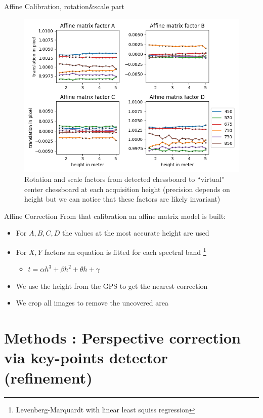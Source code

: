 \documentclass{beamer}
\begin{document}
		\begin{frame}{Affine Calibration, rotation\&scale part}
			\begin{figure}
				\includegraphics[width=0.7\linewidth]{../figures/affine-rotation-height.png}
				\caption{Rotation and scale factors from detected chessboard to ``virtual'' center chessboard at each acquisition height (precision depends on height but we can notice that these factors are likely invariant)}
			\end{figure}
		\end{frame}
	
		\begin{frame}{Affine Correction}
			From that calibration an affine matrix model is built:
			
			\begin{itemize}
				\item For $A,B,C,D$ the values at the most accurate height are used
				\item For $X,Y$ factors an equation is fitted for each spectral band \footnote{Levenberg-Marquardt with linear least squiss regression}
				\begin{itemize}
					\item $t = \alpha h^3 + \beta h^2 + \theta h + \gamma$
				\end{itemize}
				\item We use the height from the GPS to get the nearest correction
				\item We crop all images to remove the uncovered area
			\end{itemize}
		
		\end{frame}
	
	\section{Methods : Perspective correction via key-points detector (refinement)}
	
\end{document}
